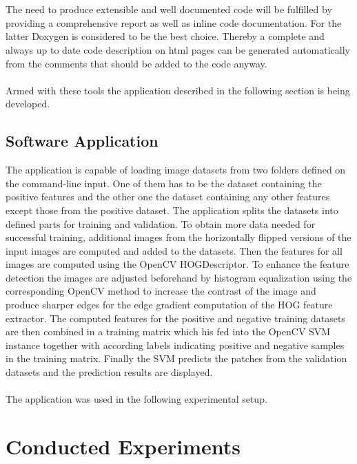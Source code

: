 \documentclass[%
   final,      %
   paper=a4,%
   paper=portrait, %
   pagesize=auto, %
   fontsize=10pt,%
   version=last, %
 ]{scrartcl} %
\begin{document}
\\
\\
The need to produce extensible and well documented code will be fulfilled by providing a comprehensive report as well as inline code documentation. For the latter Doxygen is considered to be the best choice. Thereby a complete and always up to date code description on html pages can be generated automatically from the comments that should be added to the code anyway.
\\
\\
Armed with these tools the application described in the following section is being developed.

\subsection{Software Application}

The application is capable of loading image datasets from two folders defined on the command-line input. One of them has to be the dataset containing the positive features and the other one the dataset containing any other features except those from the positive dataset. The application splits the datasets into defined parts for training and validation. To obtain more data needed for successful training, additional images from the horizontally flipped versions of the input images are computed and added to the datasets. Then the features for all images are computed using the OpenCV HOGDescriptor. To enhance the feature detection the images are adjusted beforehand by histogram equalization using the corresponding OpenCV method to increase the contrast of the image and produce sharper edges for the edge gradient computation of the HOG feature extractor. The computed features for the positive and negative training datasets are then combined in a training matrix which his fed into the OpenCV SVM instance together with according labels indicating positive and negative samples in the training matrix. Finally the SVM predicts the patches from the validation datasets and the prediction results are displayed.
\\
\\
The application was used in the following experimental setup.

\section{Conducted Experiments}
\end{document}
